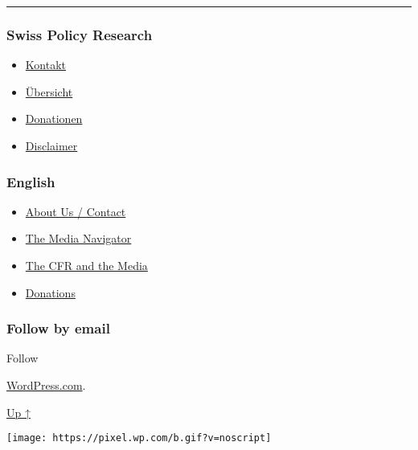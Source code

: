 \begin{center}\rule{0.5\linewidth}{\linethickness}\end{center}

\hypertarget{swiss-policy-research}{%
\subsubsection{Swiss Policy Research}\label{swiss-policy-research}}

\begin{itemize}
\tightlist
\item
  \href{https://swprs.org/kontakt/}{Kontakt}
\item
  \href{https://swprs.org/uebersicht/}{Übersicht}
\item
  \href{https://swprs.org/donationen/}{Donationen}
\item
  \href{https://swprs.org/disclaimer/}{Disclaimer}
\end{itemize}

\hypertarget{english}{%
\subsubsection{English}\label{english}}

\begin{itemize}
\tightlist
\item
  \href{https://swprs.org/contact/}{About Us / Contact}
\item
  \href{https://swprs.org/media-navigator/}{The Media Navigator}
\item
  \href{https://swprs.org/the-american-empire-and-its-media/}{The CFR
  and the Media}
\item
  \href{https://swprs.org/donations/}{Donations}
\end{itemize}

\hypertarget{follow-by-email}{%
\subsubsection{Follow by email}\label{follow-by-email}}

Follow

\href{https://wordpress.com/?ref=footer_custom_com}{WordPress.com}.

\protect\hyperlink{}{Up ↑}

\texttt{[image: https://pixel.wp.com/b.gif?v=noscript]}
